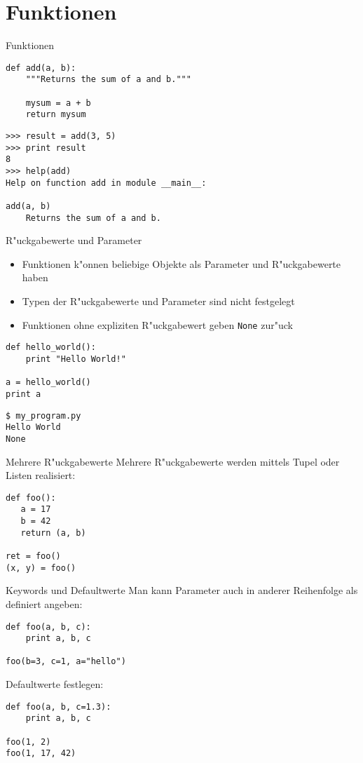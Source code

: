 \section{Funktionen}

\begin{frame}[fragile]{Funktionen}
\begin{lstlisting}[style=Python]
def add(a, b):
    """Returns the sum of a and b."""

    mysum = a + b
    return mysum
\end{lstlisting}

\begin{lstlisting}[style=Shell]
>>> result = add(3, 5)
>>> print result
8
>>> help(add)
Help on function add in module __main__:

add(a, b)
    Returns the sum of a and b.
\end{lstlisting}
\end{frame}

\begin{frame}[fragile]{R"uckgabewerte und Parameter}
\begin{itemize}
\item Funktionen k"onnen beliebige Objekte als Parameter und R"uckgabewerte haben
\item Typen der R"uckgabewerte und Parameter sind nicht festgelegt
\item Funktionen ohne expliziten R"uckgabewert geben \lstinline{None} zur"uck
\end{itemize}
\begin{lstlisting}[style=Python]
def hello_world():
    print "Hello World!"

a = hello_world()
print a
\end{lstlisting}
\begin{lstlisting}[style=Shell]
$ my_program.py
Hello World
None
\end{lstlisting} %
\end{frame}

\begin{frame}[fragile]{Mehrere R"uckgabewerte}
Mehrere R"uckgabewerte werden mittels Tupel oder Listen realisiert:
\begin{lstlisting}[style=Python]
def foo():
   a = 17
   b = 42
   return (a, b)

ret = foo()
(x, y) = foo()
\end{lstlisting}
\end{frame}

\begin{frame}[fragile]{Keywords und Defaultwerte}
Man kann Parameter auch in anderer Reihenfolge als definiert angeben:
\begin{lstlisting}[style=Python]
def foo(a, b, c):
    print a, b, c

foo(b=3, c=1, a="hello")
\end{lstlisting}
Defaultwerte festlegen:
\begin{lstlisting}[style=Python]
def foo(a, b, c=1.3):
    print a, b, c

foo(1, 2)
foo(1, 17, 42)
\end{lstlisting}
\end{frame}

